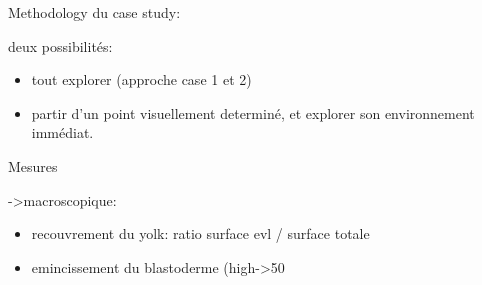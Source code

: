   Methodology du case study: 

  deux possibilités: 
\begin{itemize}
	\item tout explorer (approche case 1 et 2)
	\item partir d'un point visuellement determiné, et explorer son environnement immédiat.
\end{itemize}

  Mesures 

  ->macroscopique:  
\begin{itemize}
	\item recouvrement du yolk: ratio surface evl / surface totale
	\item emincissement du blastoderme (high->50%
\end{itemize}

